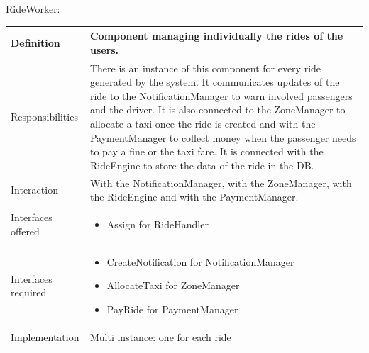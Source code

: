 \documentclass[a4paper,11pt]{report} %
\begin{document}
	\pagebreak
	\centerline{RideWorker:}
	\begin{center}
		\begin{tabular}{| l | p{9cm} |}\hline
			Definition & Component managing individually the rides of the users.\\\hline
			Responsibilities & There is an instance of this component for every ride generated by the system. It communicates updates of the ride to the NotificationManager to warn involved passengers and the driver. It is also connected to the ZoneManager to allocate a taxi once the ride is created and with the PaymentManager to collect money when the passenger needs to pay a fine or the taxi fare. It is connected with the RideEngine to store the data of the ride in the DB.\\\hline
			Interaction & With the NotificationManager, with the ZoneManager, with the RideEngine and with the PaymentManager.\\\hline
			Interfaces offered & \begin{itemize}
				\item Assign for RideHandler
			\end{itemize}\\\hline
			Interfaces required & \begin{itemize}
				\item CreateNotification for NotificationManager
				\item AllocateTaxi for ZoneManager
				\item PayRide for PaymentManager
			\end{itemize}\\\hline
			Implementation & Multi instance: one for each ride\\\hline
		\end{tabular}
	\end{center}	
	
	\pagebreak
\end{document}
